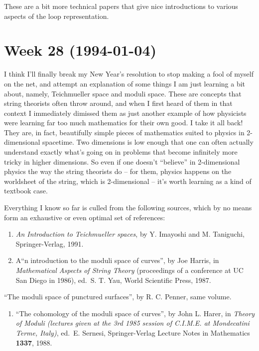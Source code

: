 \documentclass{article}
\def\tightlist{}
\begin{document}
These are a bit more technical papers that give nice introductions to
various aspects of the loop representation.
\hypertarget{week-28-1994-01-04}{%
\section{Week 28 (1994-01-04)}\label{week-28-1994-01-04}}

I think I'll finally break my New Year's resolution to stop making a
fool of myself on the net, and attempt an explanation of some things I
am just learning a bit about, namely, Teichmueller space and moduli
space. These are concepts that string theorists often throw around, and
when I first heard of them in that context I immediately dimissed them
as just another example of how physicists were learning far too much
mathematics for their own good. I take it all back! They are, in fact,
beautifully simple pieces of mathematics suited to physics in
2-dimensional spacetime. Two dimensions is low enough that one can often
actually understand exactly what's going on in problems that become
infinitely more tricky in higher dimensions. So even if one doesn't
``believe'' in 2-dimensional physics the way the string theorists do --
for them, physics happens on the worldsheet of the string, which is
2-dimensional -- it's worth learning as a kind of textbook case.

Everything I know so far is culled from the following sources, which by
no means form an exhaustive or even optimal set of references:

\begin{enumerate}
\def\labelenumi{\arabic{enumi})}
\item
  \emph{An Introduction to Teichmueller spaces}, by Y. Imayoshi and M.
  Taniguchi, Springer-Verlag, 1991.
\item
  A``n introduction to the moduli space of curves'', by Joe Harris, in
  \emph{Mathematical Aspects of String Theory} (proceedings of a
  conference at UC San Diego in 1986), ed.~S. T. Yau, World Scientific
  Press, 1987.
\end{enumerate}

``The moduli space of punctured surfaces'', by R. C. Penner, same
volume.

\begin{enumerate}
\def\labelenumi{\arabic{enumi})}
\setcounter{enumi}{2}
\tightlist
\item
  ``The cohomology of the moduli space of curves'', by John L. Harer, in
  \emph{Theory of Moduli (lectures given at the 3rd 1985 session of
  C.I.M.E. at Mondecatini Terme, Italy)}, ed.~E. Sernesi,
  Springer-Verlag Lecture Notes in Mathematics \textbf{1337}, 1988.
\end{enumerate}
\end{document}
